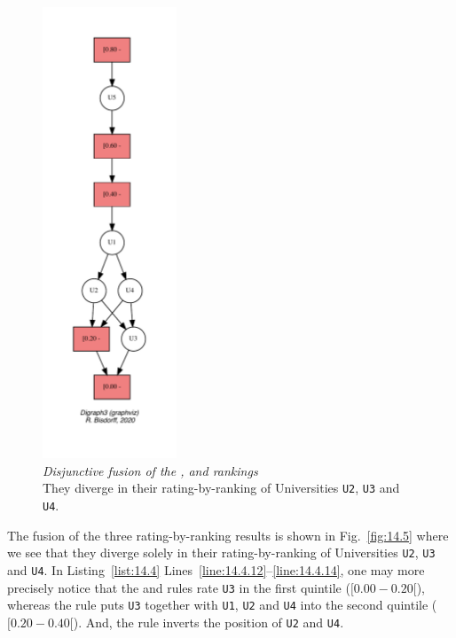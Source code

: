 \begin{figure}[ht]
\sidecaption[t]
\includegraphics[width=4cm]{Figures/14-5-fusionResult.pdf}
\caption[Disjunctive fusion of the \Kemeny, \Copeland and \NetFlows rankings]{\emph{Disjunctive fusion of the \Kemeny, \Copeland and \NetFlows rankings}\\ They diverge in their rating-by-ranking of Universities \texttt{U2}, \texttt{U3} and \texttt{U4}.}
\label{fig:14.5}       %
\end{figure}

The fusion of the three rating-by-ranking results is shown in Fig.~\vref{fig:14.5} where we see that they diverge solely in their rating-by-ranking of Universities \texttt{U2}, \texttt{U3} and \texttt{U4}. In Listing~\vref{list:14.4} Lines~\ref{line:14.4.12}--\ref{line:14.4.14}, one may more precisely notice that the \Kemeny and \Copeland rules rate \texttt{U3} in the first quintile ($[0.00- 0.20[$), whereas the \NetFlows rule puts \texttt{U3} together with \texttt{U1}, \texttt{U2} and \texttt{U4} into the second quintile ($[0.20- 0.40[$). And, the \Kemeny rule inverts the position of \texttt{U2} and \texttt{U4}.


